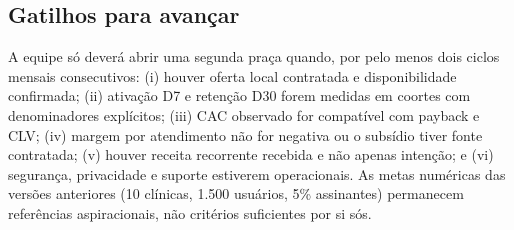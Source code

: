 \subsection{Gatilhos para avançar}
A equipe só deverá abrir uma segunda praça quando, por pelo menos dois ciclos mensais consecutivos: (i) houver oferta local contratada e disponibilidade confirmada; (ii) ativação D7 e retenção D30 forem medidas em coortes com denominadores explícitos; (iii) CAC observado for compatível com payback e CLV; (iv) margem por atendimento não for negativa ou o subsídio tiver fonte contratada; (v) houver receita recorrente recebida e não apenas intenção; e (vi) segurança, privacidade e suporte estiverem operacionais. As metas numéricas das versões anteriores (10 clínicas, 1.500 usuários, 5\% assinantes) permanecem referências aspiracionais, não critérios suficientes por si sós.